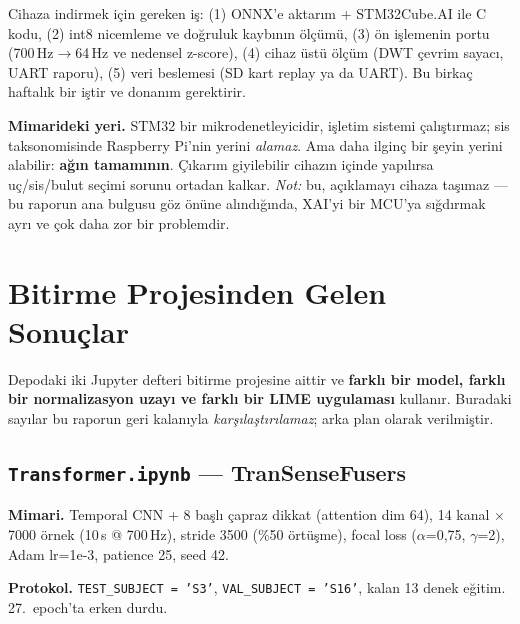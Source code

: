 \documentclass[11pt,a4paper]{report}
\newcommand{\kod}[1]{\texttt{\small #1}}
\newcommand{\dosya}[1]{\texttt{\footnotesize #1}}
\begin{document}
\begin{uyari}
Cihaza indirmek için gereken iş: (1) ONNX'e aktarım + STM32Cube.AI ile C kodu,
(2) int8 nicemleme ve doğruluk kaybının ölçümü, (3) ön işlemenin portu
(700\,Hz$\rightarrow$64\,Hz ve nedensel z-score), (4) cihaz üstü ölçüm (DWT
çevrim sayacı, UART raporu), (5) veri beslemesi (SD kart replay ya da UART).
Bu birkaç haftalık bir iştir ve donanım gerektirir.

\textbf{Mimarideki yeri.} STM32 bir mikrodenetleyicidir, işletim sistemi
çalıştırmaz; sis taksonomisinde Raspberry Pi'nin yerini \emph{alamaz}. Ama daha
ilginç bir şeyin yerini alabilir: \textbf{ağın tamamının}. Çıkarım giyilebilir
cihazın içinde yapılırsa uç/sis/bulut seçimi sorunu ortadan kalkar.
\emph{Not:} bu, açıklamayı cihaza taşımaz --- bu raporun ana bulgusu göz önüne
alındığında, XAI'yi bir MCU'ya sığdırmak ayrı ve çok daha zor bir problemdir.
\end{uyari}

\chapter{Bitirme Projesinden Gelen Sonuçlar}
\label{sec:bitirme}

Depodaki iki Jupyter defteri bitirme projesine aittir ve \textbf{farklı bir
model, farklı bir normalizasyon uzayı ve farklı bir LIME uygulaması}
kullanır. Buradaki sayılar bu raporun geri kalanıyla \emph{karşılaştırılamaz};
arka plan olarak verilmiştir.

\section{\dosya{Transformer.ipynb} --- TranSenseFusers}

\textbf{Mimari.} Temporal CNN + 8 başlı çapraz dikkat (attention dim 64),
14 kanal $\times$ 7000 örnek (10\,s @ 700\,Hz), stride 3500 (\%50 örtüşme),
focal loss ($\alpha$=0{,}75, $\gamma$=2), Adam lr=1e-3, patience 25, seed 42.

\textbf{Protokol.} \kod{TEST\_SUBJECT = 'S3'}, \kod{VAL\_SUBJECT = 'S16'},
kalan 13 denek eğitim. 27.\ epoch'ta erken durdu.
\end{document}
